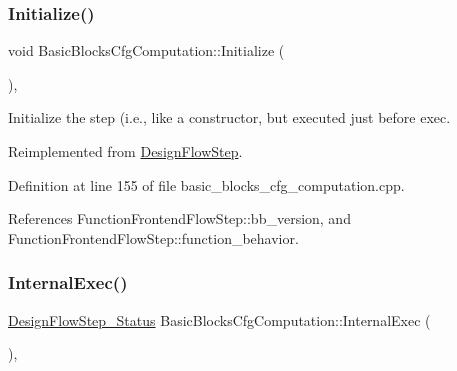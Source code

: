 \mbox{\label{classBasicBlocksCfgComputation_a210b95e3205f3d1c797be0ad2a4b6671}} 
\subsubsection{\texorpdfstring{Initialize()}{Initialize()}}
{\footnotesize\ttfamily void Basic\+Blocks\+Cfg\+Computation\+::\+Initialize (\begin{DoxyParamCaption}{ }\end{DoxyParamCaption})\hspace{0.3cm}{\ttfamily [override]}, {\ttfamily [virtual]}}



Initialize the step (i.\+e., like a constructor, but executed just before exec. 



Reimplemented from \hyperlink{classDesignFlowStep_a44b50683382a094976e1d432a7784799}{Design\+Flow\+Step}.



Definition at line 155 of file basic\+\_\+blocks\+\_\+cfg\+\_\+computation.\+cpp.



References Function\+Frontend\+Flow\+Step\+::bb\+\_\+version, and Function\+Frontend\+Flow\+Step\+::function\+\_\+behavior.

\mbox{\label{classBasicBlocksCfgComputation_a466edbf43995a1c596d1c9f63e61e7df}} 
\subsubsection{\texorpdfstring{Internal\+Exec()}{InternalExec()}}
{\footnotesize\ttfamily \hyperlink{design__flow__step_8hpp_afb1f0d73069c26076b8d31dbc8ebecdf}{Design\+Flow\+Step\+\_\+\+Status} Basic\+Blocks\+Cfg\+Computation\+::\+Internal\+Exec (\begin{DoxyParamCaption}{ }\end{DoxyParamCaption})\hspace{0.3cm}{\ttfamily [override]}, {\ttfamily [virtual]}}



